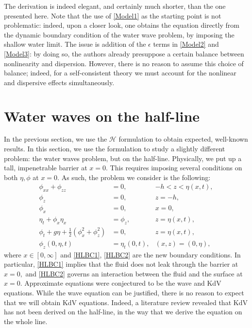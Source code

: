 \documentclass[11pt,reqno,oneside,a4paper]{article}
\begin{document}
The derivation is indeed elegant, and certainly much shorter, than the one presented here. Note that the use of \eqref{Model1} as the starting point is not problematic: indeed, upon a closer look, one obtains the equation directly from the dynamic boundary condition of the water wave problem, by imposing the shallow water limit. The issue is addition of the $\epsilon$ terms in \eqref{Model2} and \eqref{Model3}: by doing so, the authors already presuppose a certain balance between nonlinearity and dispersion. However, there is no reason to assume this choice of balance; indeed, for a self-consistent theory we must account for the nonlinear and dispersive effects simultaneously. 

\section{Water waves on the half-line}
In the previous section, we use the $\mathcal{H}$ formulation to obtain expected, well-known results. In this section, we use the formulation to study a slightly different problem: the water waves problem, but on the half-line. Physically, we put up a tall, impenetrable barrier at $x = 0.$ This requires imposing several conditions on both $\eta, \phi$ at $x = 0.$ As such, the problem we consider is the following:
\begin{subequations}\label{DimHalfLineProblem}
\begin{align}
\phi_{xx} + \phi_{zz} &= 0, &-h < z < \eta(x,t), \\
\phi_{z} &= 0, &z = -h, \\
\phi_{x} &= 0, &x =0, \label{HLBC1}\\
\eta_t + \phi_{x}\eta_{x} &= \phi_{z}, & z = \eta(x,t), \\
\phi_t + g\eta + \frac{1}{2}(\phi_{x}^2 + \phi_{z}^2) &= 0, &z = \eta(x,t), \\
\phi_{z}(0,\eta,t) &= \eta_t(0,t), &(x,z) = (0,\eta), \label{HLBC2}
\end{align}
\end{subequations}
where $x\in[0,\infty]$ and \eqref{HLBC1}, \eqref{HLBC2} are the new boundary conditions. In particular, \eqref{HLBC1} implies that the fluid does not leak through the barrier at $x=0,$ and \eqref{HLBC2} governs an interaction between the fluid and the surface at $x = 0.$ Approximate equations were conjectured to be the wave and KdV equations. While the wave equation can be justified, there is no reason to expect that we will obtain KdV equations. Indeed, a literature review revealed that KdV has not been derived on the half-line, in the way that we derive the equation on the whole line. 
\end{document}
